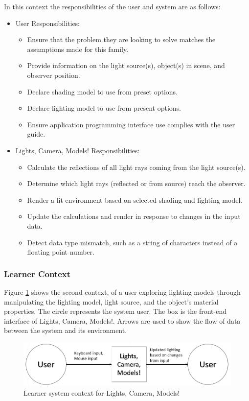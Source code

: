 \documentclass[12pt]{article}
\newcommand{\famname}{Lights, Camera, Models!} %
\begin{document}
In this context the responsibilities of the user and system are as follows:
\begin{itemize}
\item User Responsibilities:
	\begin{itemize}
	\item Ensure that the problem they are looking to solve matches the 
	assumptions 
	made for this family.
	\item Provide information on the light source(s), object(s) in scene, and 
	observer position.
	\item Declare shading model to use from preset options.
	\item Declare lighting model to use from present options.
	\item Ensure application programming interface use complies with the user 
	guide.
	\end{itemize}
\item \famname{} Responsibilities:
	\begin{itemize}
	\item Calculate the reflections of all light rays coming from the light 
	source(s).
	\item Determine which light rays (reflected or from source) reach the 
	observer.
	\item Render a lit environment based on selected shading and lighting model.
	\item Update the calculations and render in response to changes in the 
	input 
	data.
	\item Detect data type mismatch, such as a string of characters instead of a
	  floating point number.
	\end{itemize}
\end{itemize}

\subsubsection{Learner Context}
Figure \ref{fig:system-context-2} shows the second context, of a user exploring 
lighting models through manipulating the lighting model, light source, and the 
object's material properties. The circle represents the system user. The box is 
the front-end interface of \famname. Arrows are used to show the flow of data 
between the system and its environment.

\begin{figure}[h]
	\centering
	\includegraphics[scale=0.5]{./images/system-context-2}
	\caption{Learner system context for \famname}
	\label{fig:system-context-2}
\end{figure}
\end{document}
